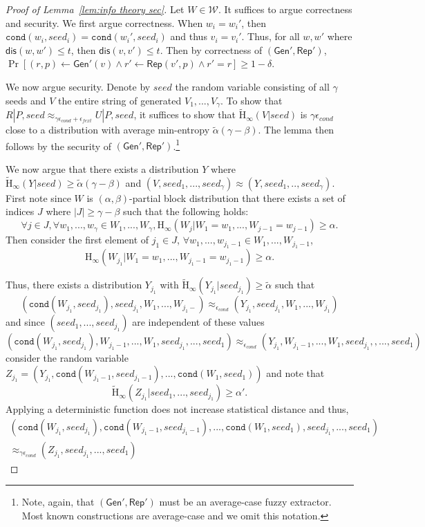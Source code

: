\documentclass[11pt]{article}
\newcommand{\lemref}[1]{\mbox{Lemma~\ref{#1}}}
\newcommand{\class}[1]{{\ensuremath{\mathsf{#1}}}}
\newcommand{\gen}{\ensuremath{\class{Gen}}\xspace}
\newcommand{\rep}{\ensuremath{\class{Rep}}\xspace}
\newcommand{\dis}{\ensuremath{\mathsf{dis}}}
\newcommand{\Hoo}{\mathrm{H}_\infty}
\newcommand{\Hav}{\tilde{\mathrm{H}}_\infty}
\newcommand{\ext}{\ensuremath{\mathtt{ext}}}
\newcommand{\cond}{\ensuremath{\mathtt{cond}}}
\begin{document}
\begin{proof}[Proof of \lemref{lem:info theory sec}]
Let $W\in \mathcal{W}$.
It suffices to argue correctness and security.  We first argue correctness.
When $w_i = w_i'$, then $\cond(w_i , seed_i) = \cond(w_i', seed_i)$ and thus $v_i = v_i'$.  Thus, for all $w, w'$ where $\dis(w, w')\le t$, then $\dis (v, v')\le t$.  Then by correctness of $(\gen', \rep')$, $\Pr[(r, p)\leftarrow \gen'(v) \wedge r'\leftarrow \rep(v',p) \wedge r' = r]\ge 1-\delta$.

We now argue security.  Denote by $seed$ the random variable consisting of all $\gamma$ seeds and $V$ the entire string of generated $V_1,..., V_\gamma$.  To show that $R | P, seed \approx_{\gamma \epsilon_{cond} + \epsilon_{fext}} U | P, seed$, it suffices to show that $\Hav(V | seed)$ is $\gamma \epsilon_{cond}$ close to a distribution with average min-entropy $\tilde{\alpha}(\gamma - \beta)$.  The lemma then follows by the security of $(\gen', \rep')$.\footnote{Note, again, that $(\gen', \rep')$ must be an average-case fuzzy extractor.  Most known constructions are average-case and we omit this notation.}

We now argue that there exists a distribution $Y$ where $\Hav(Y | seed)\ge \tilde{\alpha}(\gamma - \beta)$ and $(V, seed_1,..., seed_\gamma)\approx (Y, seed_1,.., seed_\gamma)$.  First note since $W$ is $(\alpha, \beta)$-partial block distribution that
there exists a set of indices $J$ where $|J| \geq \gamma - \beta$ such that the following holds:
\[
\forall j\in J, \forall w_1,..., w_\gamma \in W_1,..., W_\gamma, \Hoo(W_j | W_1 = w_1,..., W_{j-1}=w_{j-1}) \geq \alpha.
\]
Then consider the first element of $j_1\in J$, $\forall w_1,..., w_{j_1-1}\in W_1,..., W_{j_1-1}$,
\[\Hoo(W_{j_1} | W_1 = w_1,..., W_{j_1-1} = w_{j_1-1})\ge \alpha.\]

\noindent
Thus, there exists a distribution $Y_{j_1}$ with $\Hav(Y_{j_1} | seed_{j_1}) \ge \tilde{\alpha}$ such that
\[(\cond (W_{j_1}, seed_{j_1}), seed_{j_1}, W_1,..., W_{j_1-}) \approx_{\epsilon_{cond}} (Y_{j_1}, seed_{j_1}, W_1,..., W_{j_1})\]
and since $(seed_1,..., seed_{j_1})$ are independent of these values
\[(\cond (W_{j_1},seed_{j_1}), W_{j_1-1},..., W_1, seed_{j_1}, ..., seed_{1}) \approx_{\epsilon_{cond}} (Y_{j_1}, W_{j_1-1},..., W_1, seed_{j_1}, , ...,  seed_{1})\]
consider the random variable $Z_{j_1} =( Y_{j_1}, \cond(W_{j_1-1},seed_{j_1-1}),..., \cond(W_{1}, seed_{1}))$ and note that \[\Hav(Z_{j_1} | seed_1,...,seed_{j_1})\ge \alpha'.\]
Applying a deterministic function does not increase statistical distance and thus,
\begin{align*}
(\cond (W_{j_1}, seed_{j_1}), \cond(W_{j_1-1}, seed_{j_1-1}),..., \cond(W_1, seed_1), seed_{j_1},..., seed_{1}) \\\approx_{\gamma \epsilon_{cond}} (Z_{j_1}, seed_{j_1},..., seed_1)
\end{align*}


\end{proof}
\end{document}
